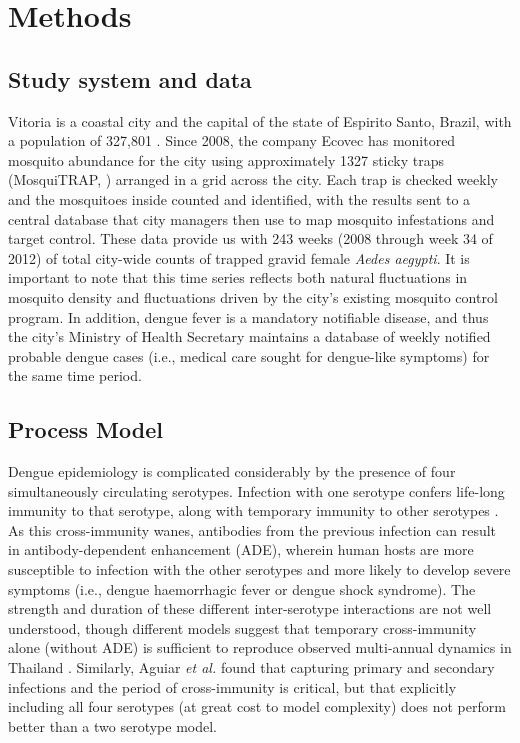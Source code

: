 \documentclass[10pt,letterpaper]{article}
\begin{document}
\section*{Methods}

\subsection*{Study system and data}

Vitoria is a coastal city and the capital of the state of Espirito Santo, Brazil, with a population of 327,801 \cite{vitpop}.
Since 2008, the company Ecovec has monitored mosquito abundance for the city using approximately 1327 sticky traps (MosquiTRAP, \cite{Eiras2009}) arranged in a grid across the city.
Each trap is checked weekly and the mosquitoes inside counted and identified, with the results sent to a central database that city managers then use to map mosquito infestations and target control.
These data provide us with 243 weeks (2008 through week 34 of 2012) of total city-wide counts of trapped gravid female \emph{Aedes aegypti}.
It is important to note that this time series reflects both natural fluctuations in mosquito density and fluctuations driven by the city's existing mosquito control program.
In addition, dengue fever is a mandatory notifiable disease, and thus the city's Ministry of Health Secretary maintains a database of weekly notified probable dengue cases (i.e., medical care sought for dengue-like symptoms) for the same time period.

\subsection*{Process Model}

Dengue epidemiology is complicated considerably by the presence of four simultaneously circulating serotypes.
Infection with one serotype confers life-long immunity to that serotype, along with temporary immunity to other serotypes \cite{Wearing2006}.  
As this cross-immunity wanes, antibodies from the previous infection can result in antibody-dependent enhancement (ADE), wherein human hosts are more susceptible to infection with the other serotypes and more likely to develop severe symptoms (i.e., dengue haemorrhagic fever or dengue shock syndrome)\cite{Wearing2006}.
The strength and duration of these different inter-serotype interactions are not well understood, though different models suggest that temporary cross-immunity alone (without ADE) is sufficient to reproduce observed multi-annual dynamics in Thailand \cite{Wearing2006,Reich2013}.
Similarly, Aguiar \emph{et al.} \cite{Aguiar2013} found that capturing primary and secondary infections and the period of cross-immunity is critical, but that explicitly including all four serotypes (at great cost to model complexity) does not perform better than a two serotype model.
\end{document}
